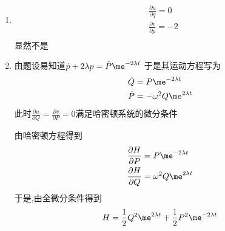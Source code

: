 \begin{solution}
    \begin{enumerate}[label=(\arabic*)]
        \item \begin{align*}
            &\frac{\partial u}{\partial q}=0\\
            &\frac{\partial v}{\partial p}=-2\\
              \end{align*}
        显然不是
        \item 由题设易知道$\dot p+2\lambda p=\dot P \me^{-2\lambda t}$
        于是其运动方程写为
        \begin{align*}
            \dot Q&=P\me^{-2\lambda t}\\
            \dot P&=-\omega^2 Q\me^{2\lambda t}
        \end{align*}
        此时$\frac{\partial u}{\partial Q}=\frac{\partial v}{\partial P}=0$满足哈密顿系统的微分条件

        由哈密顿方程得到
        \begin{align*}
            \frac{\partial H}{\partial P}&=P\me^{-2\lambda t}\\
            \frac{\partial H}{\partial Q}&=\omega^2 Q\me^{2\lambda t}
        \end{align*}
        于是,由全微分条件得到
        $$H=\frac12 Q^2\me^{2\lambda t}+\frac12 P^2\me^{-2\lambda t}$$
    \end{enumerate}
\end{solution}
